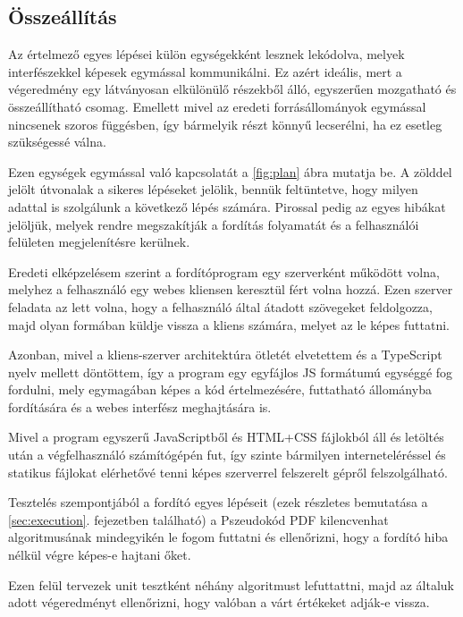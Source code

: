 \subsection{Összeállítás}

Az értelmező egyes lépései külön egységekként lesznek lekódolva, melyek interfészekkel képesek egymással kommunikálni. Ez azért ideális, mert a végeredmény egy látványosan elkülönülő részekből álló, egyszerűen mozgatható és összeállítható csomag. Emellett mivel az eredeti forrásállományok egymással nincsenek szoros függésben, így  bármelyik részt könnyű lecserélni, ha ez esetleg szükségessé válna.

Ezen egységek egymással való kapcsolatát a \ref{fig:plan} ábra mutatja be. A zölddel jelölt útvonalak a sikeres lépéseket jelölik, bennük feltüntetve, hogy milyen adattal is szolgálunk a következő lépés számára. Pirossal pedig az egyes hibákat jelöljük, melyek rendre megszakítják a fordítás folyamatát és a felhasználói felületen megjelenítésre kerülnek.


Eredeti elképzelésem szerint a fordítóprogram egy szerverként működött volna, melyhez a felhasználó egy webes kliensen keresztül fért volna hozzá. Ezen szerver feladata az lett volna, hogy a felhasználó által átadott szövegeket feldolgozza, majd olyan formában küldje vissza a kliens számára, melyet az le képes futtatni.

Azonban, mivel a kliens-szerver architektúra ötletét elvetettem és a TypeScript nyelv mellett döntöttem, így a program egy egyfájlos JS formátumú egységgé fog fordulni, mely egymagában képes a kód értelmezésére, futtatható állományba fordítására és a webes interfész meghajtására is.

Mivel a program egyszerű JavaScriptből és HTML+CSS fájlokból áll és letöltés után a végfelhasználó számítógépén fut, így szinte bármilyen interneteléréssel és statikus fájlokat elérhetővé tenni képes szerverrel felszerelt gépről felszolgálható.

Tesztelés szempontjából a fordító egyes lépéseit (ezek részletes bemutatása a \ref{sec:execution}. fejezetben található) a Pszeudokód PDF kilencvenhat algoritmusának mindegyikén le fogom futtatni és ellenőrizni, hogy a fordító hiba nélkül végre képes-e hajtani őket.

Ezen felül tervezek unit tesztként néhány algoritmust lefuttattni, majd az általuk adott végeredményt ellenőrizni, hogy valóban a várt értékeket adják-e vissza.

